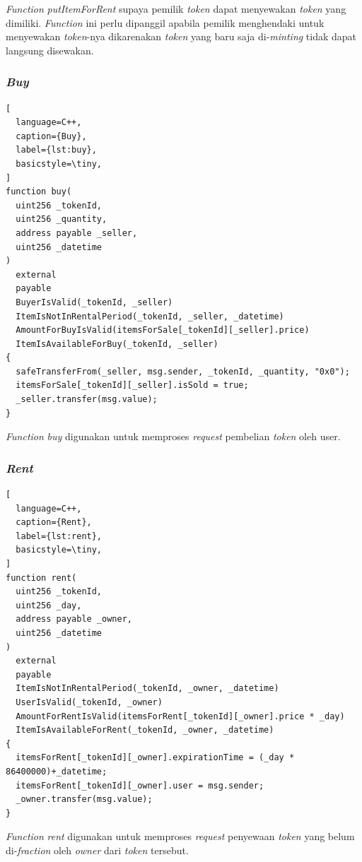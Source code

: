 \emph{Function} \emph{putItemForRent} supaya pemilik \emph{token} dapat menyewakan \emph{token} yang dimiliki. \emph{Function} ini perlu dipanggil apabila pemilik menghendaki untuk menyewakan \emph{token}-nya dikarenakan \emph{token} yang baru saja di-\emph{minting} tidak dapat langsung disewakan.

\subsubsection{\emph{Buy}}

\begin{lstlisting}[
  language=C++,
  caption={Buy},
  label={lst:buy},
  basicstyle=\tiny,
]
function buy(
  uint256 _tokenId,
  uint256 _quantity,
  address payable _seller,
  uint256 _datetime
)
  external
  payable
  BuyerIsValid(_tokenId, _seller)
  ItemIsNotInRentalPeriod(_tokenId, _seller, _datetime)
  AmountForBuyIsValid(itemsForSale[_tokenId][_seller].price)
  ItemIsAvailableForBuy(_tokenId, _seller)
{
  safeTransferFrom(_seller, msg.sender, _tokenId, _quantity, "0x0");
  itemsForSale[_tokenId][_seller].isSold = true;
  _seller.transfer(msg.value);
}
\end{lstlisting}

\emph{Function} \emph{buy} digunakan untuk memproses \emph{request}  pembelian \emph{token} oleh user.

\subsubsection{\emph{Rent}}

\begin{lstlisting}[
  language=C++,
  caption={Rent},
  label={lst:rent},
  basicstyle=\tiny,
]
function rent(
  uint256 _tokenId,
  uint256 _day,
  address payable _owner,
  uint256 _datetime
)
  external
  payable
  ItemIsNotInRentalPeriod(_tokenId, _owner, _datetime)
  UserIsValid(_tokenId, _owner)
  AmountForRentIsValid(itemsForRent[_tokenId][_owner].price * _day)
  ItemIsAvailableForRent(_tokenId, _owner, _datetime)
{
  itemsForRent[_tokenId][_owner].expirationTime = (_day * 86400000)+_datetime;
  itemsForRent[_tokenId][_owner].user = msg.sender;
  _owner.transfer(msg.value);
}
\end{lstlisting}

\emph{Function} \emph{rent} digunakan untuk memproses \emph{request} penyewaan \emph{token} yang belum di-\emph{fraction} oleh \emph{owner} dari \emph{token} tersebut.


